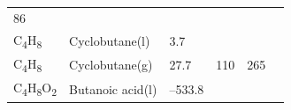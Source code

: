 \documentclass[
  9pt,
]{extbook}
\theoremstyle{definition}
\theoremstyle{definition}
\theoremstyle{definition}
\theoremstyle{remark}
\begin{document}
\begin{longtable}[]{@{}llllll@{}}
\begin{minipage}[t]{0.14\columnwidth}
86\strut
\end{minipage}\tabularnewline
\begin{minipage}[t]{0.07\columnwidth}\raggedright
C\textsubscript{4}H\textsubscript{8}\strut
\end{minipage} & \begin{minipage}[t]{0.17\columnwidth}\raggedright
Cyclobutane(l)\strut
\end{minipage} & \begin{minipage}[t]{0.15\columnwidth}\raggedright
3.7\strut
\end{minipage} & \begin{minipage}[t]{0.15\columnwidth}\raggedright
\strut
\end{minipage} & \begin{minipage}[t]{0.14\columnwidth}\raggedright
\strut
\end{minipage} & \begin{minipage}[t]{0.14\columnwidth}\raggedright
\strut
\end{minipage}\tabularnewline
\begin{minipage}[t]{0.07\columnwidth}\raggedright
C\textsubscript{4}H\textsubscript{8}\strut
\end{minipage} & \begin{minipage}[t]{0.17\columnwidth}\raggedright
Cyclobutane(g)\strut
\end{minipage} & \begin{minipage}[t]{0.15\columnwidth}\raggedright
27.7\strut
\end{minipage} & \begin{minipage}[t]{0.15\columnwidth}\raggedright
110\strut
\end{minipage} & \begin{minipage}[t]{0.14\columnwidth}\raggedright
265\strut
\end{minipage} & \begin{minipage}[t]{0.14\columnwidth}\raggedright
\strut
\end{minipage}\tabularnewline
\begin{minipage}[t]{0.07\columnwidth}\raggedright
C\textsubscript{4}H\textsubscript{8}O\textsubscript{2}\strut
\end{minipage} & \begin{minipage}[t]{0.17\columnwidth}\raggedright
Butanoic acid(l)\strut
\end{minipage} & \begin{minipage}[t]{0.15\columnwidth}\raggedright
--533.8\strut
\end{minipage} & \begin{minipage}[t]{0.15\columnwidth}\raggedright

\end{minipage}
\end{longtable}
\end{document}
